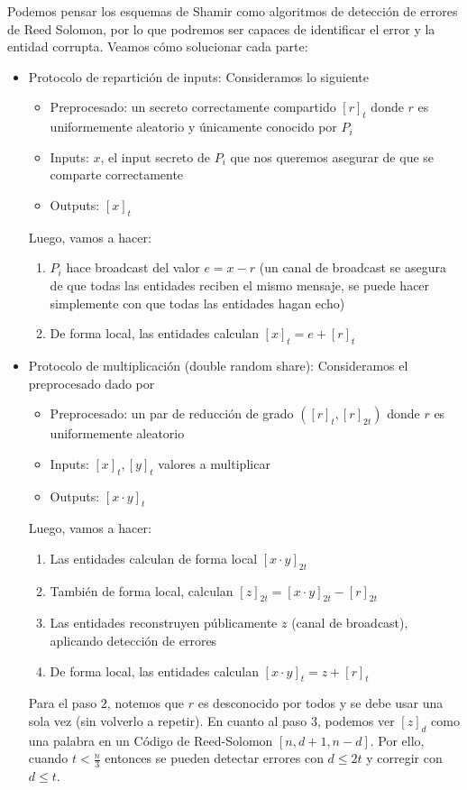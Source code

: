   Podemos pensar los esquemas de Shamir como algoritmos de detección de errores de Reed Solomon, por lo que podremos ser capaces de
  identificar el error y la entidad corrupta.
  Veamos cómo solucionar cada parte:
  \begin{itemize}
    \item Protocolo de repartición de inputs: Consideramos lo siguiente
      \begin{itemize}
        \item Preprocesado: un secreto correctamente compartido $[r]_t$ donde $r$ es uniformemente aleatorio y 
          únicamente conocido por $P_i$
        \item Inputs: $x$, el input secreto de $P_i$ que nos queremos asegurar de que se comparte correctamente 
        \item Outputs: $[x]_t$
      \end{itemize}
      Luego, vamos a hacer:
      \begin{enumerate}
        \item $P_i$ hace broadcast del valor $e = x - r$ (un canal de broadcast se asegura de que todas las entidades 
          reciben el mismo mensaje, se puede hacer simplemente con que todas las entidades hagan echo)
        \item De forma local, las entidades calculan $[x]_t = e + [r]_t$
      \end{enumerate}
    \item Protocolo de multiplicación (double random share): Consideramos el preprocesado dado por
      \begin{itemize}
        \item Preprocesado: un par de reducción de grado $([r]_t,[r]_{2t})$ donde $r$ es uniformemente aleatorio 
        \item Inputs: $[x]_t, [y]_t$ valores a multiplicar 
        \item Outputs: $[x \cdot y]_t$
      \end{itemize}
      Luego, vamos a hacer:
      \begin{enumerate}
        \item Las entidades calculan de forma local $[x \cdot y]_{2t}$
        \item También de forma local, calculan $[z]_{2t} = [x \cdot y]_{2t} - [r]_{2t}$
        \item Las entidades reconstruyen públicamente $z$ (canal de broadcast), aplicando detección de errores 
        \item De forma local, las entidades calculan $[x \cdot y]_t = z + [r]_t$
      \end{enumerate}
      \begin{remark}
        Para el paso $2$, notemos que $r$ es desconocido por todos y se debe usar una sola vez (sin volverlo a repetir).
        En cuanto al paso $3$, podemos ver $[z]_d$ como una palabra en un Código de Reed-Solomon $[n,d+1,n-d]$.
        Por ello, cuando $t < \frac{n}{3}$ entonces se pueden detectar errores con $d \leq 2t$ y corregir con $d \leq t$.


\end{remark}
\end{itemize}
